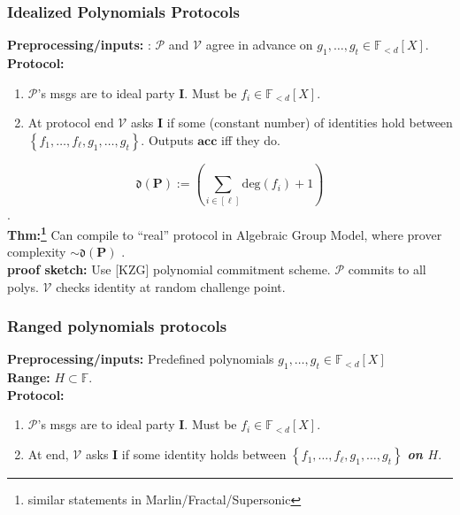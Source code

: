 \documentclass[shadesubsections,compress,14pt,mathserif]{beamer}
\newcommand{\prot}{\mathbf{P}}
\newcommand{\aggdeg}[1]{\mathfrak{d}(#1)}
\renewcommand{\deg}{\mathrm{deg}}
\newcommand{\F}{\ensuremath{\mathbb F}}
\newcommand{\set}[1]{\ensuremath{\left\{#1\right\}}}
\newcommand{\defeq}{\ensuremath{:=}}
\newcommand{\ver}{\ensuremath{\mathcal{V}}}
\newcommand{\prv}{\ensuremath{\mathcal{P}}}
\newcommand{\polysofdeg}[1]{\F_{< #1}[X]}
\newcommand{\acc}{{\mathbf{acc}}}
\newcommand{\ideal}{\mathbf{I}}
\begin{document}
\begin{frame}
\frametitle{Idealized Polynomials Protocols}   %
 
 \textbf{Preprocessing/inputs:} : $\prv$ and $\ver$ agree in advance on $g_1,\ldots,g_t\in \polysofdeg{d}$.\\
 \vspace{0.4in}
\textbf{Protocol:}
  \begin{enumerate}

\item 
$\prv$'s  msgs are to ideal party $\ideal$. Must be $f_i\in \polysofdeg{d}$.
 \item At protocol end $\ver$ asks $\ideal$ if some (constant number) of identities hold between $\set{f_1,\ldots,f_\ell,g_1,\ldots,g_t}$.  Outputs $\acc$ iff they do.
\end{enumerate}
\end{frame}
\begin{frame}


$$\aggdeg{\prot}\defeq\left(\sum_{i\in [\ell]} \deg(f_i)+1\right)$$.\pause \\
 \vspace{0.2in}
\textbf{Thm:\footnote{similar statements in Marlin/Fractal/Supersonic}}
Can compile to ``real'' protocol in Algebraic Group Model, where prover complexity  $\sim \aggdeg{\prot}$ .\\ \pause
 \vspace{0.2in}
\textbf{proof sketch:}
 Use [KZG] polynomial commitment scheme. $\prv$ commits to all polys. $\ver$ checks identity at random challenge point. 
\end{frame}
\begin{frame}
\frametitle{Ranged polynomials protocols}   %

\textbf{Preprocessing/inputs:} Predefined polynomials $g_1,\ldots,g_t\in \polysofdeg{d}$\\
\textbf{Range:} $H\subset\F$.\\ \pause
\vspace{0.4in}
\textbf{Protocol:}
 
 \begin{enumerate}
\item $\prv$'s  msgs are to ideal party $\ideal$. Must be $f_i\in \polysofdeg{d}$.
\item At end, $\ver$ asks $\ideal$ if some identity holds between $\set{f_1,\ldots,f_\ell,g_1,\ldots,g_t}$   \textbf{\textit{on $H$}}. 

\end{enumerate}
\end{frame}
\end{document}
